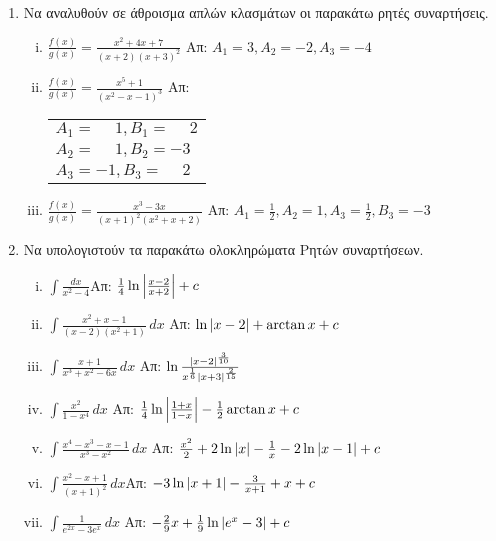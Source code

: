 \documentclass[a4paper]{article}
\theoremstyle{definition}
\theoremstyle{remark}
\begin{document}
\begin{center}
\end{center}

\vspace{2\baselineskip}
\everymath{\displaystyle}
\pagestyle{empty}

\begin{enumerate}

\item Να αναλυθούν σε άθροισμα απλών κλασμάτων οι παρακάτω ρητές συναρτήσεις.

\begin{enumerate}[i)]
\item $\frac{f(x)}{g(x)}=\frac{x^2+4x+7}{(x+2)(x+3)^2}$ \hfill Απ: $A_1=3, A_2=-2, A_3=-4$
\item $\frac{f(x)}{g(x)}=\frac{x^5+1}{(x^2-x-1)^3}$ \hfill Απ: \begin{tabular}{l} 
$A_1=\phantom{-}1, B_1=\phantom{-}2$ \\ $A_2=\phantom{-}1, B_2=-3$ \\ $A_3=-1, B_3=\phantom{-}2$
\end{tabular}
\item $\frac{f(x)}{g(x)}=\frac{x^3-3x}{(x+1)^2(x^2+x+2)}$ \hfill Απ: $A_1=\frac{1}{2}, A_2=1, A_3=\frac{1}{2}, B_3=-3$
\end{enumerate}

\item Να υπολογιστούν τα παρακάτω ολοκληρώματα Ρητών συναρτήσεων.

\begin{enumerate}[i)]
\item $\int\frac{dx}{x^2-4}$\hfill Απ: $\frac{1}{4}\ln\abs{\frac{x-2}{x+2}}+c$
\item $\int\frac{x^2+x-1}{(x-2)(x^2+1)}\,dx$ \hfill Απ: $\ln\abs{x-2}+\arctan x+c$
\item $\int\frac{x+1}{x^3+x^2-6x}\,dx$ \hfill Απ: $\ln\frac{\abs{x-2}^{\frac{3}{10}}}{x^{\frac{1}{6}}\abs{x+3}^{\frac{2}{15}}}$
\item $\int\frac{x^2}{1-x^4}\,dx$ \hfill Απ: $\frac{1}{4}\ln\abs{\frac{1+x}{1-x}}-\frac{1}{2}\arctan x+c$
\item $\int\frac{x^4-x^3-x-1}{x^3-x^2}\,dx$ \hfill Απ: $\frac{x^2}{2}+2\ln\abs{x}-\frac{1}{x}-2\ln\abs{x-1}+c$
\item $\int \frac{x^2-x+1}{(x+1)^2}\,dx$\hfill Απ: $-3\ln\abs{x+1}-\frac{3}{x+1}+x+c$
\item $\int\frac{1}{e^{2x}-3e^{x}}\,dx$ \hfill Απ: $-\frac{2}{9}x+\frac{1}{9}\ln\abs{e^x-3}+c$
\end{enumerate}




\end{enumerate}
\end{document}
